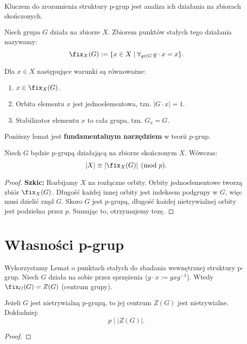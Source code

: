 Kluczem do zrozumienia struktury p-grup jest analiza ich działania na zbiorach skończonych.

\begin{definition}
    Niech grupa $G$ działa na zbiorze $X$. Zbiorem punktów stałych tego działania nazywamy:
    \[
    \fix_{X}(G) := \{x\in X \mid \forall_{g\in G} \, g\cdot x = x \}.
    \] 
\end{definition} 

\begin{remark}
    Dla $x \in X$ następujące warunki są równoważne:
    \begin{enumerate}[label=\alph*)]
        \item $x\in \fix_{X}(G)$.
        \item Orbita elementu $x$ jest jednoelementowa, tzn. $|G\cdot x| = 1$.
        \item Stabilizator elementu $x$ to cała grupa, tzn. $G_x = G$.
    \end{enumerate}
\end{remark}

Poniższy lemat jest \textbf{fundamentalnym narzędziem} w teorii p-grup.

\begin{lemma}
    Niech $G$ będzie p-grupą działającą na zbiorze skończonym $X$. Wówczas:
    \[
    |X| \equiv |\fix_{X}(G)| \pmod{p}.
    \]
\end{lemma} 
\begin{proof}
    \textbf{Szkic:} Rozbijamy $X$ na rozłączne orbity. Orbity jednoelementowe tworzą zbiór $\fix_X(G)$. Długość każdej innej orbity jest indeksem podgrupy w $G$, więc musi dzielić rząd $G$. Skoro $G$ jest p-grupą, długość każdej nietrywialnej orbity jest podzielna przez $p$. Sumując to, otrzymujemy tezę.

\end{proof} 

\section{Własności p-grup}

Wykorzystamy Lemat o punktach stałych do zbadania wewnętrznej struktury p-grup. Niech $G$ działa na sobie przez sprzężenia ($g \cdot x := gxg^{-1}$). Wtedy $\fix_G(G) = Z(G)$ (centrum grupy).

\begin{theorem}
    Jeżeli $G$ jest nietrywialną p-grupą, to jej centrum $Z(G)$ jest nietrywialne. Dokładniej:
    \[ p \mid |Z(G)|. \]
\end{theorem} 
\begin{proof}
\end{proof} 

